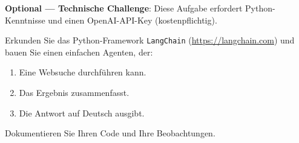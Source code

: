 \begin{mychallenge}
      \begin{myattention}
            \textbf{Optional --- Technische Challenge}: Diese Aufgabe erfordert Python-Kenntnisse
            und einen OpenAI-API-Key (kostenpflichtig).
      \end{myattention}

      Erkunden Sie das Python-Framework \texttt{LangChain} (\url{https://langchain.com})
      und bauen Sie einen einfachen Agenten, der:
      \begin{enumerate}
            \item Eine Websuche durchführen kann.
            \item Das Ergebnis zusammenfasst.
            \item Die Antwort auf Deutsch ausgibt.
      \end{enumerate}

      Dokumentieren Sie Ihren Code und Ihre Beobachtungen.
\end{mychallenge}
